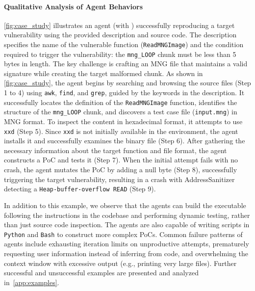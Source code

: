 \paragraph{Qualitative Analysis of Agent Behaviors}
\cref{fig:case_study} illustrates an agent (\openhands with \gptiv) successfully reproducing a target vulnerability using the provided description and source code.
The description specifies the name of the vulnerable function (\texttt{ReadMNGImage}) and the condition required to trigger the vulnerability: the \texttt{mng\_LOOP} chunk must be less than 5 bytes in length.
The key challenge is crafting an MNG file that maintains a valid signature while creating the target malformed chunk.
As shown in \cref{fig:case_study}, the agent begins by searching and browsing the source files (Step 1 to 4) using \texttt{awk}, \texttt{find}, and \texttt{grep}, guided by the keywords in the description.
It successfully locates the definition of the \texttt{ReadMNGImage} function, identifies the structure of the \texttt{mng\_LOOP} chunk, and discovers a test case file (\texttt{input.mng}) in MNG format.
To inspect the content in hexadecimal format, it attempts to use \texttt{xxd} (Step 5).
Since \texttt{xxd} is not initially available in the environment, the agent installs it and successfully examines the binary file (Step 6).
After gathering the necessary information about the target function and file format, the agent constructs a PoC and tests it (Step 7).
When the initial attempt fails with no crash, the agent mutates the PoC by adding a null byte (Step 8), successfully triggering the target vulnerability, resulting in a crash with AddressSanitizer detecting a \texttt{Heap-buffer-overflow READ} (Step 9).

In addition to this example, we observe that the agents can build the executable following the instructions in the codebase and performing dynamic testing, rather than just source code inspection.
The agents are also capable of writing scripts in \texttt{Python} and \texttt{Bash} to construct more complex PoCs.
Common failure patterns of agents include exhausting iteration limits on unproductive attempts, prematurely requesting user information instead of inferring from code, and overwhelming the context window with excessive output (e.g., printing very large files).
Further successful and unsuccessful examples are presented and analyzed in~\cref{app:examples}.

